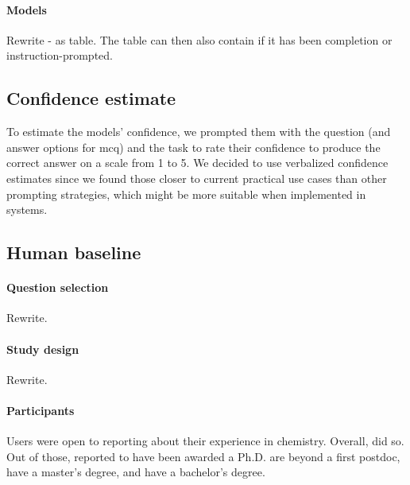 \documentclass[11pt, oneside]{article}
\begin{document}
\begin{refsection}
\paragraph{Models}
Rewrite - as table. The table can then also contain if it has been completion or instruction-prompted.

\subsection{Confidence estimate}
To estimate the models' confidence, we prompted them with the question (and answer options for \gls{mcq}) and the task to rate their confidence to produce the correct answer on a scale from 1 to 5. 
We decided to use verbalized confidence estimates\autocite{xiong2023llms} since we found those closer to current practical use cases than other prompting strategies, which might be more suitable when implemented in systems.

\subsection{Human baseline}


\paragraph{Question selection} \label{sec:subset-selection}
Rewrite.

\paragraph{Study design}
Rewrite.

\paragraph{Participants}
Users were open to reporting about their experience in chemistry. 
Overall,  did so. 
Out of those,  reported to have been awarded a Ph.D.
 are beyond a first postdoc,  have a master's degree, and  have a bachelor's degree.



\end{refsection}
\end{document}
